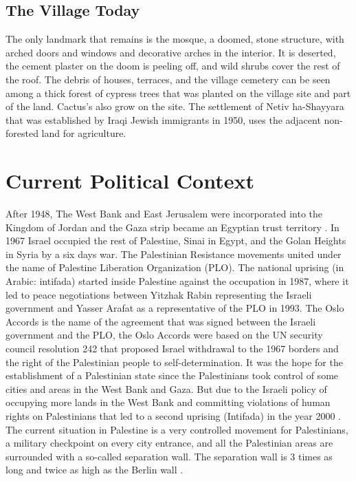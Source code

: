 \subsection{The Village Today}

The only landmark that remains is the mosque, a doomed, stone structure, with arched doors and windows and decorative arches in the interior. It is deserted, the cement plaster on the doom is peeling off, and wild shrubs cover the rest of the roof. The debris of houses, terraces, and the village cemetery can be seen among a thick forest of cypress trees that was planted on the village site and part of the land. Cactus's also grow on the site. The settlement of Netiv ha-Shayyara that was established by Iraqi Jewish immigrants in 1950, uses the adjacent non-forested land for agriculture.    
\section{Current Political Context}

After 1948, The West Bank and East Jerusalem were incorporated into the Kingdom of Jordan and the Gaza strip became an Egyptian trust territory \citep{Houdaille2010}. In 1967 Israel occupied the rest of Palestine, Sinai in Egypt, and the Golan Heights in Syria by a six days war. The Palestinian Resistance movements united under the name of Palestine Liberation Organization (PLO). The national uprising (in Arabic: intifada) started inside Palestine against the occupation in 1987, where it led to peace negotiations between Yitzhak Rabin representing the Israeli government and Yasser Arafat as a representative of the PLO in 1993. The Oslo Accords is the name of the agreement that was signed between the Israeli government and the PLO, the Oslo Accords were based on the UN security council resolution 242 that proposed Israel withdrawal to the 1967 borders and the right of the Palestinian people to self-determination. It was the hope for the establishment of a Palestinian state since the Palestinians took control of some cities and areas in the West Bank and Gaza. But due to the Israeli policy of occupying more lands in the West Bank and committing violations of human rights on Palestinians that led to a second uprising (Intifada) in the year 2000 \citep{Shalhoub-Kevorkian2006}. The current situation in Palestine is a very controlled movement for Palestinians, a military checkpoint on every city entrance, and all the Palestinian areas are surrounded with a so-called separation wall. The separation wall is 3 times as long and twice as high as the Berlin wall \citep{Shalhoub-Kevorkian2006}.




